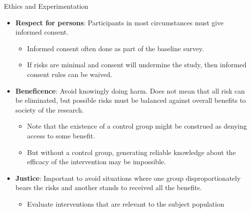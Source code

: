 \documentclass{beamer}
\numberwithin{equation}{section}
\begin{document}
\begin{frame}{Ethics and Experimentation}
\small
\begin{itemize}
\itemsep1pt\parskip0pt
\item
  \textbf{Respect for persons}: Participants in most circumstances must
  give informed consent.

  \begin{itemize}
  \itemsep1pt\parskip0pt
  \item
    Informed consent often done as part of the baseline survey.
  \item
    If risks are minimal and consent will undermine the study, then
    informed consent rules can be waived. \pause
  \end{itemize}
\item
  \textbf{Beneficence}: Avoid knowingly doing harm. Does not mean that all
  risk can be eliminated, but possible risks must be balanced against
  overall benefits to society of the research.

  \begin{itemize}
  \itemsep1pt\parskip0pt
  \item
    Note that the existence of a control group might be construed as
    denying access to some benefit.
  \item
    But without a control group, generating reliable knowledge about the
    efficacy of the intervention may be impossible. \pause
  \end{itemize}
\item
  \textbf{Justice}: Important to avoid situations where one group
  disproportionately bears the risks and another stands to received all
  the benefits.

  \begin{itemize}
  \itemsep1pt\parskip0pt
  \item
    Evaluate interventions that are relevant to the subject population
  \end{itemize}
\end{itemize}

\end{frame}
\end{document}
